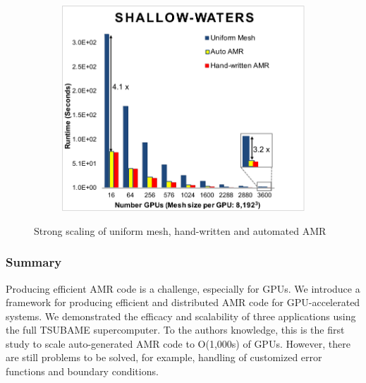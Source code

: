 \documentclass{book}
\begin{document}
\begin{figure}
\begin{subfigure}[t]{0.32\textwidth}
\centering
\includegraphics[width=\textwidth]{figs/amr08.pdf} 
 \end{subfigure}
\caption{Strong scaling of uniform mesh, hand-written and automated AMR}
\label{fig:4}
\end{figure}
\subsubsection{Summary}
Producing efficient AMR code is a challenge, especially for GPUs. We introduce a framework for producing efficient and distributed AMR code for GPU-accelerated systems. We demonstrated the efficacy and scalability of three applications using the full TSUBAME supercomputer. To the authors knowledge, this is the first study to scale auto-generated AMR code to O(1,000s) of GPUs. However, there are still problems to be solved, for example, handling of customized error functions and boundary conditions.
\end{document}
